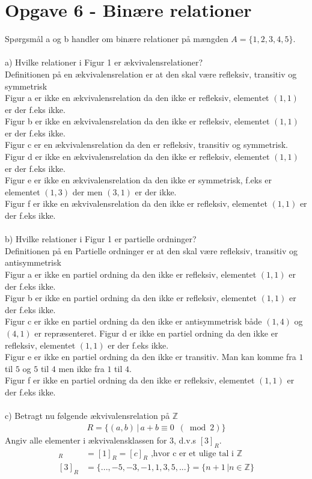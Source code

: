 \documentclass[a4paper,10pt]{article}
\begin{document}
\section{Opgave 6 - Binære relationer}
Spørgsmål a og b handler om binære relationer på mængden $A = \{1,2,3,4,5\}$.\\\\
a) Hvilke relationer i Figur 1 er ækvivalensrelationer?\\
Definitionen på en ækvivalensrelation er at den skal være refleksiv, transitiv og symmetrisk\\
Figur a er ikke en ækvivalensrelation da den ikke er refleksiv, elementet $(1,1)$ er der  f.eks ikke.\\
Figur b er ikke en ækvivalensrelation da den ikke er refleksiv, elementet $(1,1)$ er der  f.eks ikke.\\
Figur c er en ækvivalensrelation da den er refleksiv, transitiv og symmetrisk.
Figur d er ikke en ækvivalensrelation da den ikke er refleksiv, elementet $(1,1)$ er der  f.eks ikke.\\
Figur e er ikke en ækvivalensrelation da den ikke er symmetrisk, f.eks er elementet $(1,3)$ der men $(3,1)$ er der ikke.\\
Figur f er ikke en ækvivalensrelation da den ikke er refleksiv, elementet $(1,1)$ er der f.eks ikke.\\\\
b) Hvilke relationer i Figur 1 er partielle ordninger?\\
Definitionen på en Partielle ordninger er at den skal være refleksiv, transitiv og antisymmetrisk\\
Figur a er ikke en partiel ordning da den ikke er refleksiv, elementet $(1,1)$ er der  f.eks ikke.\\
Figur b er ikke en partiel ordning da den ikke er refleksiv, elementet $(1,1)$ er der  f.eks ikke.\\
Figur c er ikke en partiel ordning da den ikke er antisymmetrisk både $(1,4)$ og $(4,1)$ er repræsenteret.
Figur d er ikke en partiel ordning da den ikke er refleksiv, elementet $(1,1)$ er der  f.eks ikke.\\
Figur e er ikke en partiel ordning da den ikke er transitiv. Man kan komme fra $1$ til $5$ og $5$ til $4$ men ikke fra $1$ til $4$.\\
Figur f er ikke en partiel ordning da den ikke er refleksiv, elementet $(1,1)$ er der f.eks ikke.\\\\
c) Betragt nu følgende ækvivalensrelation på $\mathbb{Z}$
\begin{align*}
R = \{(a,b)\,|\,a+b \equiv 0\,\,\, (\bmod 2) \}
\end{align*}
Angiv alle elementer i ækvivalensklassen for 3, d.v.s $[3]_R$.
\begin{align*}
[3]_R &= [1]_R = [c]_R \,\, \text{,hvor c er et ulige tal i } \mathbb{Z}\\
[3]_R &= \{...,-5,-3,-1,1,3,5,...\} = \{n+1\,|n \in \mathbb{Z}\}
\end{align*}
\end{document}
